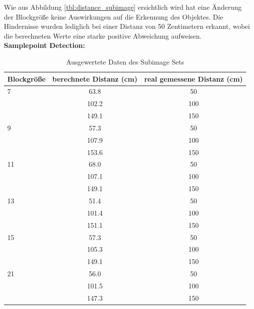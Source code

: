 \noindent
Wie aus Abbildung \ref{tbl:distance_subimage} ersichtlich wird hat eine Änderung der Blockgröße keine Auswirkungen auf die Erkennung des Objektes. Die Hindernisse wurden lediglich bei einer Distanz von 50 Zentimetern erkannt, wobei die berechneten Werte eine starke positive Abweichung aufweisen. \\

\noindent
\textbf{Samplepoint Detection:}

\begin{table}[h]
\centering
\begin{tabular}{|l||c|c|}
\hline
Blockgröße & berechnete Distanz (cm) & real gemessene Distanz (cm) \\
\hline\hline
7          & 63.8               & 50                     \\
           & 102.2              & 100                    \\
           & 149.1              & 150                    \\
\hline
9          & 57.3               & 50                     \\
           & 107.9              & 100                    \\
           & 153.6              & 150                    \\
\hline
11         & 68.0               & 50                     \\
           & 107.1              & 100                    \\
           & 149.1              & 150                    \\
\hline
13         & 51.4               & 50                     \\
           & 101.4              & 100                    \\
           & 151.1              & 150                    \\
\hline
15         & 57.3               & 50                     \\
           & 105.3              & 100                    \\
           & 149.1              & 150                    \\
\hline
21         & 56.0               & 50                     \\
           & 101.5              & 100                    \\
           & 147.3              & 150                    \\
\hline
\end{tabular}
\caption{Ausgewertete Daten des Subimage Sets }
\label{tbl:distance_samplepoint}
\end{table}


